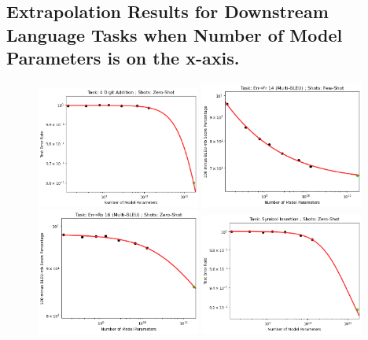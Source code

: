 \documentclass{article} %
\begin{document}
\fi

\iffalse

\clearpage

\subsection{Extrapolation Results for Downstream Language Tasks when Number of Model Parameters is on the x-axis.}
\label{section:language_tasks__number_of_parameters}

\begin{figure}[htbp]
    \centering
\includegraphics[width=0.48\textwidth]{figures/gpt-3__parameter_scaling/4D+___Zero-Shot.png}
\includegraphics[width=0.48\textwidth]{figures/gpt-3__parameter_scaling/En_to_Fr_14__Multi-BLEU____Few-Shot.png}
\includegraphics[width=0.48\textwidth]{figures/gpt-3__parameter_scaling/En_to_Ro_16__Multi-BLEU____Zero-Shot.png}
\includegraphics[width=0.48\textwidth]{figures/gpt-3__parameter_scaling/Symbol_Insertion___Zero-Shot.png}

\end{figure}
\end{document}
